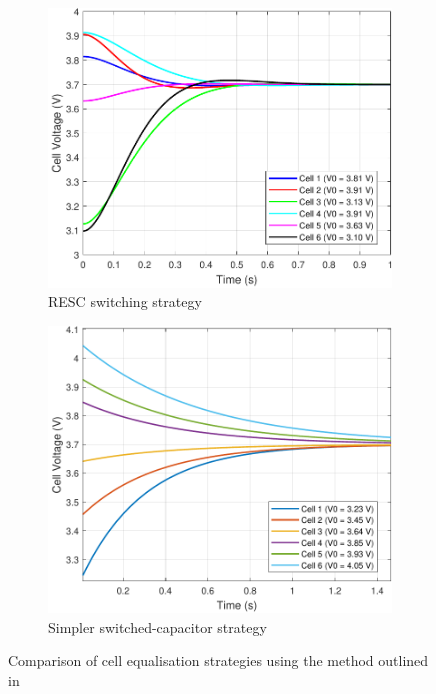\begin{figure}[H]
    \centering
    \vspace{5mm}
    \begin{subfigure}[b]{0.4\textwidth} %
        \centering
        \includegraphics[width=\textwidth]{figs/Samuel/Figures/cellV-cropped.pdf}
        \caption{\gls{RESC} switching strategy}
        \label{fig:resccrop}
    \end{subfigure}
    \hspace{0.07\textwidth}
    \begin{subfigure}[b]{0.388\textwidth} %
        \centering
        \includegraphics[width=\textwidth]{figs/Samuel/Figures/recpdf-cropped.pdf}
        \caption{Simpler switched-capacitor strategy}
        \label{fig:reccrop}
    \end{subfigure}
    \caption[Comparison of Cell Equalisation Strategies]{Comparison of cell equalisation strategies using the method outlined in \cite{8467638}}
    \label{fig:rescvrec}
\end{figure}

